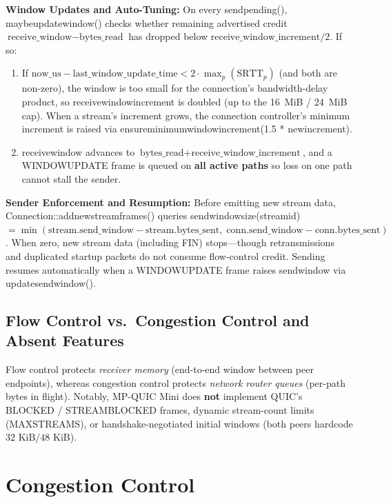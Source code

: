 \documentclass[10pt,a4paper]{article}
\newcommand{\codeul}{\textunderscore\hspace{0pt}}
\DeclareRobustCommand{\code}[1]{{\ttfamily\let\_\codeul #1}}
\begin{document}
\textbf{Window Updates and Auto-Tuning:}
On every \code{send\_pending()}, \code{maybe\_update\_window()} checks whether remaining advertised credit $\text{receive\_window} - \text{bytes\_read}$ has dropped below $\text{receive\_window\_increment} / 2$. If so:
\begin{enumerate}
    \item If $\text{now\_us} - \text{last\_window\_update\_time} < 2 \cdot \max_p(\text{SRTT}_p)$ (and both are non-zero), the window is too small for the connection's bandwidth-delay product, so \code{receive\_window\_increment} is doubled (up to the 16~MiB / 24~MiB cap). When a stream's increment grows, the connection controller's minimum increment is raised via \code{ensure\_minimum\_window\_increment(1.5 * new\_increment)}.
    \item \code{receive\_window} advances to $\text{bytes\_read} + \text{receive\_window\_increment}$, and a \code{WINDOW\_UPDATE} frame is queued on \textbf{all active paths} so loss on one path cannot stall the sender.
\end{enumerate}

\textbf{Sender Enforcement and Resumption:}
Before emitting new stream data, \code{Connection::\hspace{0pt}add\_new\_stream\_frames()} queries \code{send\_window\_size(stream\_id)} $= \min(\text{stream.send\_window} - \text{stream.bytes\_sent},\;\allowbreak \text{conn.send\_window} - \text{conn.bytes\_sent})$. When zero, new stream data (including FIN) stops—though retransmissions and duplicated startup packets do not consume flow-control credit. Sending resumes automatically when a \code{WINDOW\_UPDATE} frame raises \code{send\_window} via \code{update\_send\_window()}.

\subsection{Flow Control vs.\ Congestion Control and Absent Features}
Flow control protects \emph{receiver memory} (end-to-end window between peer endpoints), whereas congestion control protects \emph{network router queues} (per-path bytes in flight). Notably, MP-QUIC Mini does \textbf{not} implement QUIC's \code{BLOCKED} / \code{STREAM\_BLOCKED} frames, dynamic stream-count limits (\code{MAX\_STREAMS}), or handshake-negotiated initial windows (both peers hardcode $32\text{ KiB} / 48\text{ KiB}$).

\section{Congestion Control}
\end{document}
